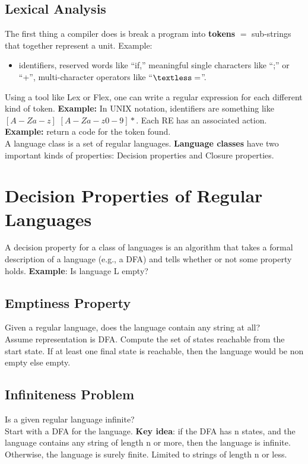 \documentclass{report}
\begin{document}
\subsection{Lexical Analysis}
The first thing a compiler does is break a program into \textbf{tokens} $=$ sub-strings that together represent a unit. Example:
\begin{itemize}
    \item  identifiers, reserved words like “if,” meaningful single characters like “;” or “+”, multi-character operators like “$\textless=$”.
\end{itemize}
Using a tool like Lex or Flex, one can write a regular expression for each different kind of token. \textbf{Example:} In UNIX notation, identifiers are something like $[A-Za-z]$ $[A-Za-z0-9]*$. Each RE has an associated action. \textbf{Example:} return a code for the token found.
\\
A language class is a set of regular languages. \textbf{Language classes} have two important kinds of properties: Decision properties and Closure properties.

\section{Decision Properties of Regular Languages}
A decision property for a class of languages is an algorithm that takes a formal description of a language (e.g., a DFA) and tells whether or not some property holds. \textbf{Example}: Is language L empty?

\subsection{Emptiness Property}
Given a regular language, does the language contain any string at all? \\
Assume representation is DFA. Compute the set of states reachable from the start state. If at least one final state is reachable, then the language would be non empty else empty.
\subsection{Infiniteness Problem}
Is a given regular language infinite? \\
Start with a DFA for the language. \textbf{Key idea}: if the DFA has n states, and
the language contains any string of length n or more, then the language is infinite. Otherwise, the language is surely finite. Limited to strings of length n or less.
\end{document}
